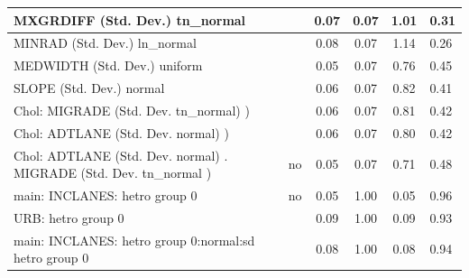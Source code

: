 \begin{table}
\begin{center}
\begin{tabular}{|l|l|c|c|c|l|}
			\hline
			MXGRDIFF (Std. Dev.) tn_normal &  & 0.07 & 0.07 & 1.01 & 0.31 \\
			\hline
			MINRAD (Std. Dev.) ln_normal &  & 0.08 & 0.07 & 1.14 & 0.26 \\
			\hline
			MEDWIDTH (Std. Dev.) uniform &  & 0.05 & 0.07 & 0.76 & 0.45 \\
			\hline
			SLOPE (Std. Dev.) normal &  & 0.06 & 0.07 & 0.82 & 0.41 \\
			\hline
			 Chol: MIGRADE (Std. Dev. tn_normal) ) &  & 0.06 & 0.07 & 0.81 & 0.42 \\
			\hline
			 Chol: ADTLANE (Std. Dev. normal) ) &  & 0.06 & 0.07 & 0.80 & 0.42 \\
			\hline
			 Chol: ADTLANE (Std. Dev. normal) . MIGRADE (Std. Dev.   tn_normal ) & no & 0.05 & 0.07 & 0.71 & 0.48 \\
			\hline
			main: INCLANES: hetro group 0 & no & 0.05 & 1.00 & 0.05 & 0.96 \\
			\hline
			URB: hetro group 0 &  & 0.09 & 1.00 & 0.09 & 0.93 \\
			\hline
			main: INCLANES: hetro group 0:normal:sd  hetro group 0 &  & 0.08 & 1.00 & 0.08 & 0.94 \\
			\hline
		\end{tabular}
	\end{center}
\end{table}